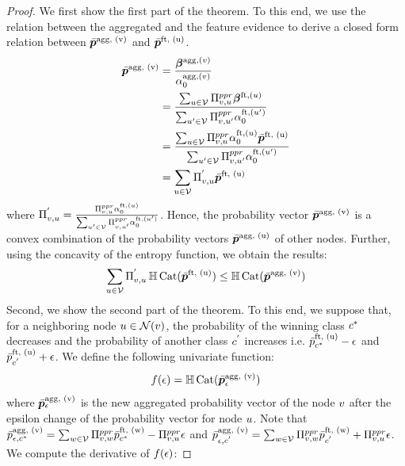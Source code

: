 \begin{proof}
We first show the first part of the theorem. To this end, we use the relation between the aggregated and the feature evidence to derive a closed form relation between $\bar{\bm{p}}^\text{agg, (v)}$ and $\bar{\bm{p}}^\text{ft, (u)}$.
\begin{align*}
    \bar{\bm{p}}^\text{agg, (v)} & = \frac{\bm{\beta}^{\text{agg}, (v)}}{\alpha_0^{\text{agg}, (v)}} \\
    & = \frac{\sum_{u \in \mathcal{V}} \Pi^{ppr}_{v, u} \bm{\beta}^{\text{ft}, (u)}}{\sum_{u' \in \mathcal{V}} \Pi^{ppr}_{v, u'} \alpha_0^{\text{ft}, (u')}}\\ 
    & = \frac{\sum_{u \in \mathcal{V}} \Pi^{ppr}_{v, u} \alpha_0^{\text{ft}, (u)} \bar{\bm{p}}^\text{ft, (u)}}{\sum_{u' \in \mathcal{V}} \Pi^{ppr}_{v, u'} \alpha_0^{\text{ft}, (u')}}\\
    & = \sum_{u \in \mathcal{V}} \Pi_{v, u}^{'} \bar{\bm{p}}^\text{ft, (u)}
\end{align*}
where $\Pi_{v, u}^{'} =  \frac{\Pi^{ppr}_{v, u} \alpha_0^{\text{ft}, (u)} }{\sum_{u' \in \mathcal{V}} \Pi^{ppr}_{v, u'} \alpha_0^{\text{ft}, (u')}}$. Hence, the probability vector $\bar{\bm{p}}^\text{agg, (v)}$ is a convex combination of the probability vectors $\bar{\bm{p}}^\text{agg, (u)}$ of other nodes. Further, using the concavity of the entropy function, we obtain the results:
\begin{align*}
    \sum_{u \in \mathcal{V}} \Pi_{v, u}^{'} \operatorname{\mathbb{H}}{\operatorname{Cat}(\bar{\bm{p}}^\text{ft, (u)})} \leq \operatorname{\mathbb{H}}{\operatorname{Cat}(\bar{\bm{p}}^\text{agg, (v)})}
\end{align*}
Second, we show the second part of the theorem. To this end, we suppose that, for a neighboring node $u \in \mathcal{N}(v)$, the probability of the winning class $c^*$ decreases and the probability of another class $c^{'}$ increases i.e. $\bar{p}_{c^*}^\text{ft, (u)} - {\epsilon}$ and $\bar{p}_{c^{'}}^\text{ft, (u)} + {\epsilon}$. We define the following univariate function:
\begin{align*}
    f({\epsilon}) = \operatorname{\mathbb{H}}{\operatorname{Cat}(\bar{\bm{p}}_{{\epsilon}}^\text{agg, (v)})}
\end{align*}
where $\bar{\bm{p}}_{{\epsilon}}^\text{agg, (v)}$ is the new aggregated probability vector of the node $v$ after the epsilon change of the probability vector for node $u$. Note that $\bar{p}_{{\epsilon}, c^*}^\text{agg, (v)} = \sum_{w \in \mathcal{V}} \Pi^{ppr}_{v, w} \bar{p}_{c^*}^\text{ft, (w)} - \Pi^{ppr}_{v, u}{\epsilon}$ and $\bar{p}_{{\epsilon}, c^{'}}^\text{agg, (v)} = \sum_{w \in \mathcal{V}} \Pi^{ppr}_{v, w} \bar{p}_{c^{'}}^\text{ft, (w)} + \Pi^{ppr}_{v, u}{\epsilon}$. We compute the derivative of $f({\epsilon})$:

\end{proof}
